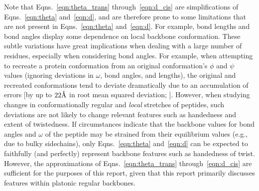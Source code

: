 \documentclass[fleqn,10pt,lineno]{wlpeerj} %
\newcommand{\n}[1]{{\color{black}#1}} %
\newcommand{\Eqns}[1]{Eqns.~\ref{#1}}
\begin{document}
\n{Note that \Eqns{eqn:theta_trans} through~\ref{eqn:d_cis} are simplifications of \Eqns{eqn:theta} and~\ref{eqn:d}, and are therefore prone to some limitations that are not present in \Eqns{eqn:theta} and~\ref{eqn:d}. For example, bond lengths \citep{Improta2015} and bond angles \citep{Esposito2013,Improta2015a} display some dependence on local backbone conformation. These subtle variations have great implications when dealing with a large number of residues, especially when considering bond angles. For example, when attempting to recreate a protein conformation from an original conformation's $\phi$ and $\psi$ values (ignoring deviations in $\omega$, bond angles, and lengths), the original and recreated conformations tend to deviate dramatically due to an accumulation of errors [by up to $22\textrm\AA$ in root mean squared deviation; \cite{Tien2013}]. However, when studying changes in conformationally regular and {\em local} stretches of peptides, such deviations are not likely to change relevant features such as handedness and extent of twistedness. If circumstances indicate that the backbone values for bond angles and $\omega$ of the peptide may be strained from their equilibrium values (e.g., due to bulky sidechains), only \Eqns{eqn:theta} and~\ref{eqn:d} can be expected to faithfully (and perfectly) represent backbone features such as \n{handedness of twist}. However, the approximations of \Eqns{eqn:theta_trans} through~\ref{eqn:d_cis} are sufficient for the purposes of this report, given that this report primarily discusses features within platonic regular backbones.}
\end{document}
